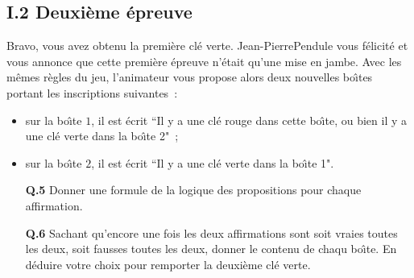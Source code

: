 \documentclass[11pt,a4paper]{article}\nofiles
\begin{document}
\subsection*{I.2 Deuxi\`eme \'epreuve}
Bravo, vous avez obtenu la premi\`ere cl\'e verte. 
Jean-PierrePendule vous f\'elicit\'e et vous annonce que cette premi\`ere \'epreuve n'\'etait qu'une mise en jambe. 
Avec les m\^emes r\`egles du jeu, l'animateur vous propose alors deux nouvelles bo\^\i tes portant les inscriptions suivantes~:
\begin{itemize}
\item sur la bo\^\i te $1$, il est \'ecrit ``Il y a une cl\'e rouge dans cette bo\^\i te, ou bien il y a une cl\'e verte dans la bo\^\i te 2"~;
\item  sur la bo\^\i te $2$, il est \'ecrit ``Il y a une cl\'e verte dans la bo\^\i te 1".
\end{itemize}
\begin{enumerate}
\item[{\bf Q.5}] Donner une formule de la logique des propositions pour chaque affirmation.
\item[{\bf Q.6}] Sachant qu'encore une fois les deux affirmations sont soit vraies toutes les deux, soit fausses toutes les deux, donner le contenu de chaqu bo\^\i te. En d\'eduire votre choix pour remporter la deuxi\`eme cl\'e verte.
\end{enumerate}
\end{document}
